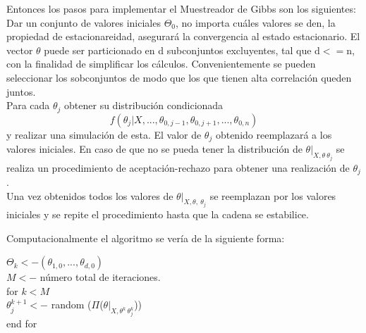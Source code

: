 Entonces los pasos para implementar el Muestreador de Gibbs son los siguientes:\\

Dar un conjunto de valores iniciales $\Theta_{0}$, no importa cuáles valores se den, la propiedad de estacionareidad, asegurará la convergencia al estado estacionario. El vector $\theta$ puede ser particionado en d subconjuntos excluyentes, tal que d$<=$n, con la finalidad de simplificar los cálculos. Convenientemente se pueden seleccionar los sobconjuntos de modo que los que tienen alta correlación queden juntos.\\

Para cada $\theta_{j}$ obtener su distribución condicionada \begin{equation*}
f(\theta_{j} |X,...,\theta_{0,j-1},\theta_{0,j+1},...,\theta_{0,n})
\end{equation*} y realizar una simulación de esta. El valor de $\theta_{j}$ obtenido reemplazará a los valores iniciales. En caso de que no se pueda tener la distribución de $\theta|_{X,\theta \ \theta_{j}}$ se realiza un procedimiento de aceptación-rechazo para obtener una realización de $\theta_{j}$.\\

Una vez obtenidos todos los valores de $\theta|_{X,\theta, \ \theta_{j}}$ se reemplazan por los valores iniciales y se repite el procedimiento hasta que la cadena se estabilice.

Computacionalmente el algoritmo se vería de la siguiente forma:\\


%


\begin{center}
	$\Theta_{k} <- (\theta_{1,0},...,\theta_{d,0})$\\
	$M<-$ número total de iteraciones.\\
	for $k < M$ \\
		
			$\theta_{j} ^{k+1}<-$ random ($\Pi$($\theta|_{X,\theta^{k} \ \theta_{j} ^{k}}$))\\
		              
	end for\\
\end{center}
									

